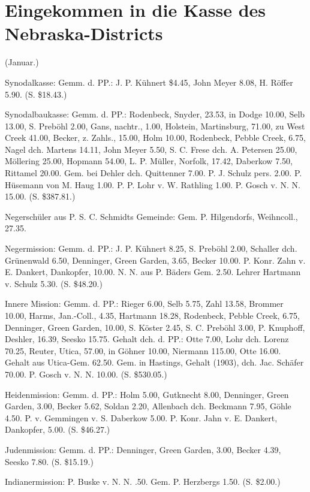 \chapter[Eingekommen in die Kasse des Nebraska-Districts]{Eingekommen in die Kasse des Nebraska-Districts}

(Januar.)

Synodalkasse: Gemm. d. PP.: J. P. Kühnert \$4.45, John Meyer 8.08, H. Röffer 5.90. (S. \$18.43.)

Synodalbaukasse: Gemm. d. PP.: Rodenbeck, Snyder, 23.53, in Dodge 10.00, Selb 13.00, S. Preböhl 2.00, Gans, nachtr., 1.00, Holstein, Martinsburg, 71.00, zu West Creek 41.00, Becker, z. Zahls., 15.00, Holm 10.00, Rodenbeck, Pebble Creek, 6.75, Nagel dch. Martens 14.11, John Meyer 5.50, S. C. Frese dch. A. Petersen 25.00, Möllering 25.00, Hopmann 54.00, L. P. Müller, Norfolk, 17.42, Daberkow 7.50, Rittamel 20.00. Gem. bei Dehler dch. Quittenner 7.00. P. J. Schulz pers. 2.00. P. Hüsemann von M. Haug 1.00. P. P. Lohr v. W. Rathling 1.00. P. Gosch v. N. N. 15.00. (S. \$387.81.)

Negerschüler aus P. S. C. Schmidts Gemeinde: Gem. P. Hilgendorfs, Weihncoll., 27.35.

Negermission: Gemm. d. PP.: J. P. Kühnert 8.25, S. Preböhl 2.00, Schaller dch. Grünenwald 6.50, Denninger, Green Garden, 3.65, Becker 10.00. P. Konr. Zahn v. E. Dankert, Dankopfer, 10.00. N. N. aus P. Bäders Gem. 2.50. Lehrer Hartmann v. Schulz 5.30. (S. \$48.20.)

Innere Mission: Gemm. d. PP.: Rieger 6.00, Selb 5.75, Zahl 13.58, Brommer 10.00, Harms, Jan.-Coll., 4.35, Hartmann 18.28, Rodenbeck, Pebble Creek, 6.75, Denninger, Green Garden, 10.00, S. Köster 2.45, S. C. Preböhl 3.00, P. Knuphoff, Deshler, 16.39, Seesko 15.75. Gehalt dch. d. PP.: Otte 7.00, Lohr dch. Lorenz 70.25, Reuter, Utica, 57.00, in Göhner 10.00, Niermann 115.00, Otte 16.00. Gehalt aus Utica-Gem. 62.50. Gem. in Hastings, Gehalt (1903), dch. Jac. Schäfer 70.00. P. Gosch v. N. N. 10.00. (S. \$530.05.)

Heidenmission: Gemm. d. PP.: Holm 5.00, Gutknecht 8.00, Denninger, Green Garden, 3.00, Becker 5.62, Soldan 2.20, Allenbach dch. Beckmann 7.95, Göhle 4.50. P. v. Gemmingen v. S. Daberkow 5.00. P. Konr. Jahn v. E. Dankert, Dankopfer, 5.00. (S. \$46.27.)

Judenmission: Gemm. d. PP.: Denninger, Green Garden, 3.00, Becker 4.39, Seesko 7.80. (S. \$15.19.)

Indianermission: P. Buske v. N. N. .50. Gem. P. Herzbergs 1.50. (S. \$2.00.)

